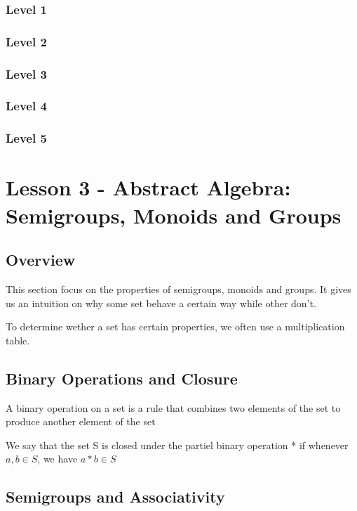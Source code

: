 \documentclass{article}
\begin{document}
\subsubsection{Level 1}
\subsubsection{Level 2}
\subsubsection{Level 3}
\subsubsection{Level 4}
\subsubsection{Level 5}
\pagebreak

\section{Lesson 3 - Abstract Algebra: Semigroups, Monoids and Groups}
\subsection{Overview}

This section focus on the properties of semigroups, monoids and groups. It gives
us an intuition on why some set behave a certain way while other don't.

To determine wether a set has certain properties, we often use a multiplication
table.

\subsection{Binary Operations and Closure}

\begin{definition}
    A binary operation on a set is a rule that combines two elements of the set to
    produce another element of the set
\end{definition}

\begin{definition}[Closed]
    We say that the set S is closed under the partiel binary operation * if
    whenever \(a,b \in S\), we have \(a * b \in S \)
\end{definition}

\subsection{Semigroups and Associativity}
\end{document}
